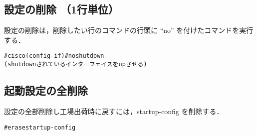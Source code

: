 \subsection*{設定の削除 （1行単位）}
設定の削除は，削除したい行のコマンドの行頭に ``no'' を付けたコマンドを実行する．

\begin{center}
\begin{screen}
\begin{alltt}
#cisco(config-if)#no shutdown
   (shutdown されているインターフェイスを up させる)
\end{alltt}
\end{screen}
\end{center}

\subsection*{起動設定の全削除}
設定の全部削除し工場出荷時に戻すには，startup-config を削除する．

\begin{center}
\begin{screen}
\begin{alltt}
#erase startup-config
\end{alltt}
\end{screen}
\end{center}


\clearpage

\clearpage

\clearpage

\clearpage

\clearpage

\clearpage

\clearpage

\clearpage

\clearpage
